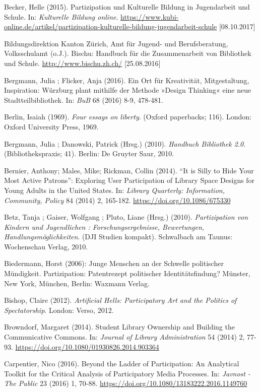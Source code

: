 \documentclass[a4paper,
fontsize=11pt,
oneside,
numbers=noperiodatend,
parskip=half-,
bibliography=totoc,
final
]{scrartcl}
\begin{document}
Becker, Helle (2015). Partizipation und Kulturelle Bildung in
Jugendarbeit und Schule. In: \emph{Kulturelle Bildung online}.
\url{https://www.kubi-online.de/artikel/partizipation-kulturelle-bildung-jugendarbeit-schule}
{[}08.10.2017{]}

Bildungsdirektion Kanton Zürich, Amt für Jugend- und Berufsberatung,
Volksschulamt (o.J.). Bischu: Handbuch für die Zusammenarbeit von
Bibliothek und Schule. \url{http://www.bischu.zh.ch/} {[}25.08.2016{]}

Bergmann, Julia ; Flicker, Anja (2016). Ein Ort für Kreativität,
Mitgestaltung, Inspiration: Würzburg plant mithilfe der Methode »Design
Thinking« eine neue Stadtteilbibliothek. In: \emph{BuB} 68 (2016) 8-9,
478-481.

Berlin, Isaiah (1969). \emph{Four essays on liberty}. (Oxford
paperbacks; 116). London: Oxford University Press, 1969.

Bergmann, Julia ; Danowski, Patrick (Hrsg.) (2010). \emph{Handbuch
Bibliothek 2.0}. (Bibliothekspraxis; 41). Berlin: De Gruyter Saur, 2010.

Bernier, Anthony; Males, Mike; Rickman, Collin (2014). \enquote{It is
Silly to Hide Your Most Active Patrons}: Exploring User Participation of
Library Space Designs for Young Adults in the United States. In:
\emph{Library Quarterly: Information, Community, Policy} 84 (2014) 2,
165-182. \url{https://doi.org/10.1086/675330}

Betz, Tanja ; Gaiser, Wolfgang ; Pluto, Liane (Hrsg.) (2010).
\emph{Partizipation von Kindern und Jugendlichen : Forschungsergebnisse,
Bewertungen, Handlungsmöglichkeiten}. (DJI Studien kompakt). Schwalbach
am Taunus: Wochenschau Verlag, 2010.

Biedermann, Horst (2006): Junge Menschen an der Schwelle politischer
Mündigkeit. Partizipation: Patentrezept politischer Identitätsfindung?
Münster, New York, München, Berlin: Waxmann Verlag.

Bishop, Claire (2012). \emph{Artificial Hells: Participatory Art and the
Politics of Spectatorship}. London: Verso, 2012.

Browndorf, Margaret (2014). Student Library Ownership and Building the
Communicative Commons. In: \emph{Journal of Library Administration} 54
(2014) 2, 77-93. \url{https://doi.org/10.1080/01930826.2014.903364}

Carpentier, Nico (2016). Beyond the Ladder of Participation: An
Analytical Toolkit for the Critical Analysis of Participatory Media
Processes. In: \emph{Javnost - The Public} 23 (2016) 1, 70-88.
\url{https://doi.org/10.1080/13183222.2016.1149760}
\end{document}

